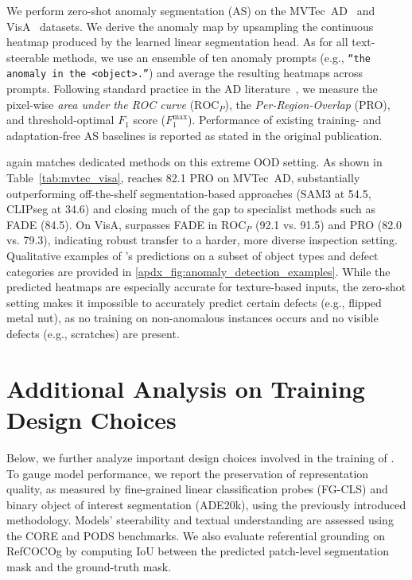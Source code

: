 We perform zero-shot anomaly segmentation (AS) on the MVTec~AD~\cite{bergmann_mvtech} and VisA~\cite{zou2022_visa_dataset} datasets.
We derive the anomaly map by upsampling the continuous heatmap produced by the learned linear segmentation head.
As for all text-steerable methods, we use an ensemble of ten anomaly prompts (e.g., \texttt{``the anomaly in the <object>.''}) and average the resulting heatmaps across prompts.
Following standard practice in the AD literature~\cite{WinCLIP_Jeong23CVPR}, we measure the pixel-wise \textit{area under the ROC curve} ($\text{ROC}_P$), the \textit{Per-Region-Overlap} (PRO), and threshold-optimal $F_1$ score ($F_1^{\max}$).
Performance of existing training- and adaptation-free AS baselines is reported as stated in the original publication.



\model{} again matches dedicated methods on this extreme OOD setting.
As shown in Table~\ref{tab:mvtec_visa}, \model{} reaches 82.1 PRO on MVTec~AD, substantially outperforming off-the-shelf segmentation-based approaches (SAM3 at 54.5, CLIPseg at 34.6) and closing much of the gap to specialist methods such as FADE (84.5).
On VisA, \model{} surpasses FADE in $\text{ROC}_P$ (92.1 vs. 91.5) and PRO (82.0 vs. 79.3), indicating robust transfer to a harder, more diverse inspection setting.
Qualitative examples of \model{}'s predictions on a subset of object types and defect categories are provided in \cref{apdx_fig:anomaly_detection_examples}.
While the predicted heatmaps are especially accurate for texture-based inputs, the zero-shot setting makes it impossible to accurately predict certain defects (e.g., flipped metal nut), as no training on non-anomalous instances occurs and no visible defects (e.g., scratches) are present. 


\section{Additional Analysis on Training Design Choices}
\label{apdx:more_ablations}

Below, we further analyze important design choices involved in the training of \model{}. To gauge model performance, we report the preservation of representation quality, as measured by fine-grained linear classification probes (FG-CLS) and binary object of interest segmentation (ADE20k), using the previously introduced methodology. Models' steerability and textual understanding are assessed using the CORE and PODS benchmarks. We also evaluate referential grounding on RefCOCOg by computing IoU between the predicted patch-level segmentation mask and the ground-truth mask.

